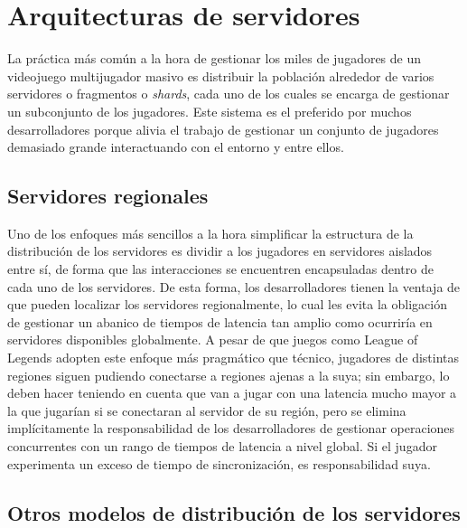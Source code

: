 \documentclass[runningheads]{llncs}
\begin{document}
\section{Arquitecturas de servidores}

La práctica más común a la hora de gestionar los miles de jugadores de un videojuego multijugador masivo es distribuir la población alrededor de varios servidores o fragmentos o \textit{shards}, cada uno de los cuales se encarga de gestionar un subconjunto de los jugadores.
Este sistema es el preferido por muchos desarrolladores porque alivia el trabajo de gestionar un conjunto de jugadores demasiado grande interactuando con el entorno y entre ellos.

\subsection{Servidores regionales}

Uno de los enfoques más sencillos a la hora simplificar la estructura de la distribución de los servidores es dividir a los jugadores en servidores aislados entre sí, de forma que las interacciones se encuentren encapsuladas dentro de cada uno de los servidores.
De esta forma, los desarrolladores tienen la ventaja de que pueden localizar los servidores regionalmente, lo cual les evita la obligación de gestionar un abanico de tiempos de latencia tan amplio como ocurriría en servidores disponibles globalmente.
A pesar de que juegos como League of Legends adopten este enfoque más pragmático que técnico, jugadores de distintas regiones siguen pudiendo conectarse a regiones ajenas a la suya; sin embargo, lo deben hacer teniendo en cuenta que van a jugar con una latencia mucho mayor a la que jugarían si se conectaran al servidor de su región, pero se elimina implícitamente la responsabilidad de los desarrolladores de gestionar operaciones concurrentes con un rango de tiempos de latencia a nivel global.
Si el jugador experimenta un exceso de tiempo de sincronización, es responsabilidad suya.

\subsection{Otros modelos de distribución de los servidores}
\end{document}
